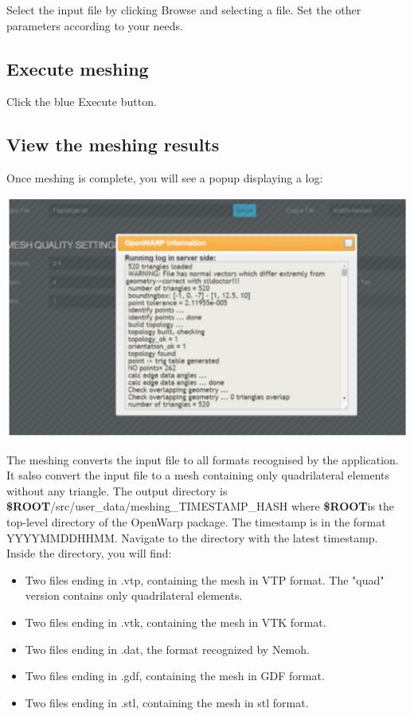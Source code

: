 \documentclass[12pt]{article}
\newcommand{\ROOT}{{\textbf{\$ROOT}}}
\begin{document}
				Select the input file by clicking Browse and selecting a file. Set the other parameters according to your needs.
				
				
	\subsection{Execute meshing}
	Click the blue Execute button.
	
	\subsection{View the meshing results}
	Once meshing is complete, you will see a popup displaying a log:
	
	\vspace{\abovedisplayskip}
	\begin{minipage}{\linewidth}
		\centering
		\includegraphics[scale=0.4]{img/24}
	\end{minipage}
	\vspace{\belowdisplayskip}
	
	The meshing converts the input file to all formats recognised by the application. It salso convert the input file to a mesh containing only quadrilateral elements without any triangle.
The output directory is \ROOT/src/user_data/meshing_TIMESTAMP_HASH where 
\ROOT is the top-level directory of the OpenWarp package.
The timestamp is in the format YYYYMMDDHHMM. Navigate to the directory with the latest timestamp. Inside the directory, you will find:
\begin{itemize}
	\item Two files ending in .vtp, containing the mesh in VTP format. The "quad" version contains only quadrilateral elements.
	\item Two files ending in .vtk, containing the mesh in VTK format. 
	\item Two files ending in .dat, the format recognized by Nemoh. 
	
	\item 
	Two files ending in .gdf, containing the mesh in GDF format. 
	\item Two files ending in .stl, containing the mesh in stl format.
\end{itemize}
\end{document}
